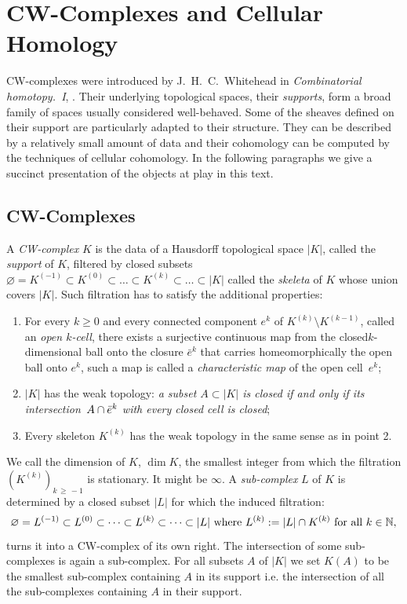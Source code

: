 \documentclass[AHL,Unicode,longabstracts,published]{cedram}
\newcommand{\N}{\mathbb{N}}
\begin{document}
\section{CW-Complexes and Cellular Homology}

CW-complexes were introduced by J.~H.~C.~Whitehead in \emph{Combinatorial homotopy.~{I}}, \cite{Whi_com_hom}. Their underlying topological spaces, their \emph{supports}, form a broad family of spaces usually considered well-behaved. Some of the sheaves defined on their support are particularly adapted to their structure. They can be described by a relatively small amount of data and their cohomology can be computed by the techniques of cellular cohomology. In the following paragraphs we give a succinct presentation of the objects at play in this text.

\subsection{CW-Complexes}

\begin{defi}[CW-Complex]
A \emph{CW-complex} $K$ is the data of a Hausdorff topological space $|K|$, called the \emph{support} of $K$, filtered by closed subsets $\varnothing=K^{(-1)}\subset K^{(0)}\subset\dots\subset K^{(k)}\subset\dots\subset |K|$ called the \emph{skeleta} of $K$ whose union covers $|K|$. Such filtration has to satisfy the additional properties:
\begin{enumerate}
\item For every $k\geq 0$ and every connected component $e^k$ of $ K^{(k)}\setminus K^{(k-1)}$, called an \emph{open $k$-cell}, there exists a surjective continuous map from the closed\linebreak $k$-dimensional ball onto the closure $\bar{e}^k$ that carries homeomorphically the open ball onto $e^k$, such a map is called a \emph{characteristic map} of the open cell~$e^k$;
\item $|K|$ has the weak topology: \emph{a subset $A\subset |K|$ is closed if and only if its intersection~$A\cap\Bar{e}^k$ with every closed cell is closed};
\item Every skeleton $K^{(k)}$ has the weak topology in the same sense as in point 2.
\end{enumerate}
We call the dimension of $K$, $\dim K$, the smallest integer from which the filtration $(K^{(k)})_{k\,\geq\,-1}$ is stationary. It might be $\infty$. A \emph{sub-complex} $L$ of $K$ is determined by a closed subset $|L|$ for which the induced filtration:
\begin{equation*}
\varnothing=L^{(-1)}\subset L^{(0)}\subset\dots\subset L^{(k)}\subset\dots\subset |L| \textnormal{ where }L^{(k)}:=|L|\cap K^{(k)} \textnormal{ for all }k\in \N,
\end{equation*}
turns it into a CW-complex of its own right. The intersection of some sub-complexes is again a sub-complex. For all subsets $A$ of $|K|$ we set $K(A)$ to be the smallest sub-complex containing $A$ in its support i.e. the intersection of all the sub-complexes containing $A$ in their support.
\end{defi}
\end{document}
